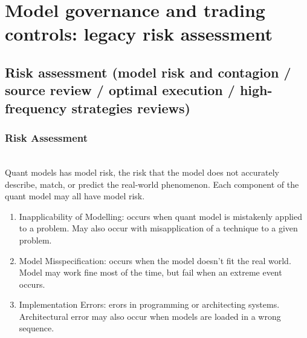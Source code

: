 \documentclass[a4paper,oneside,openany]{book}
\begin{document}
\chapter*{Model governance and trading controls: legacy risk assessment}

\section*{Risk assessment (model risk and contagion / source review / optimal execution / high-frequency strategies reviews)}

\subsection*{Risk Assessment}

\begin{definition} \\
Quant models has model risk, the risk that the model does not accurately describe, match, or predict the real-world phenomenon. Each component of the quant model may all have model risk.
\begin{enumerate}[label=\roman*.]
\setlength{\itemsep}{0pt}
\item Inapplicability of Modelling: occurs when quant model is mistakenly applied to a problem. May also occur with misapplication of a technique to a given problem.
\item Model Misspecification: occurs when the model doesn't fit the real world. Model may work fine most of the time, but fail when an extreme event occurs.
\item Implementation Errors: erors in programming or architecting systems. Architectural error may also occur when models are loaded in a wrong sequence.
\end{enumerate}
\end{definition}
\end{document}
